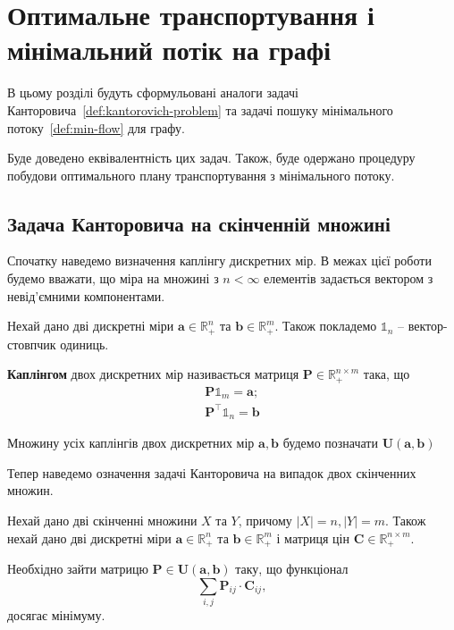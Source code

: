 \chapter{Оптимальне транспортування і мінімальний потік на графі}
\label{chap:graph}

В цьому розділі будуть сформульовані аналоги задачі Канторовича~\ref{def:kantorovich-problem}
та задачі пошуку мінімального потоку~\ref{def:min-flow} для графу.

Буде доведено еквівалентність цих задач. Також, буде одержано процедуру побудови
оптимального плану транспортування з мінімального потоку.

\section{Задача Канторовича на скінченній множині}
Спочатку наведемо визначення каплінгу дискретних мір. В межах цієї роботи будемо вважати,
що міра на множині з $n < \infty$ елементів задається вектором з невід'ємними компонентами.

\begin{definition}
    Нехай дано дві дискретні міри $\mathbf a \in \mathbb{R}_+^n$ та $\mathbf b \in \mathbb{R}_+^m$. Також покладемо
    $\mathbb{1}_n$ -- вектор-стовпчик одиниць.

    \textbf{Каплінгом} двох дискретних мір називається матриця $\mathbf{P} \in \mathbb{R}_{+}^{n \times m}$ така, що
    \begin{eqnarray*}
        \mathbf{P}\mathbb{1}_m = \mathbf a; \\
        \mathbf{P}^\top \mathbb{1}_n = \mathbf b
    \end{eqnarray*}
\end{definition}

Множину усіх каплінгів двох дискретних мір $\mathbf a, \mathbf b$ будемо позначати $\mathbf{U}\left(\mathbf a, \mathbf b\right)$

Тепер наведемо означення задачі Канторовича на випадок двох скінченних множин.

\begin{definition}
    \label{def:kantorovich-problem-d}
    Нехай дано дві скінченні множини $X$ та $Y$, причому $|X| = n, |Y| = m$. Також нехай дано дві дискретні міри
    $\mathbf a \in \mathbb{R}_+^n$ та $\mathbf b \in \mathbb{R}_+^m$ і матриця цін $\mathbf{C} \in \mathbb{R}_+^{n \times m}$.

    Необхідно зайти матрицю $\mathbf{P} \in \mathbf{U}\left(\mathbf a, \mathbf b\right)$ таку, що функціонал
    $$
        \sum_{i, j} \mathbf{P}_{ij} \cdot \mathbf{C}_{ij},
    $$
    досягає мінімуму.
\end{definition}

